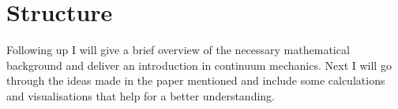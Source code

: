 \section{Structure}
Following up I will give a brief overview of the necessary mathematical background and deliver an introduction in continuum mechanics. Next I will go through the ideas made in the paper mentioned and include some calculations and visualisations that help for a better understanding. \\


